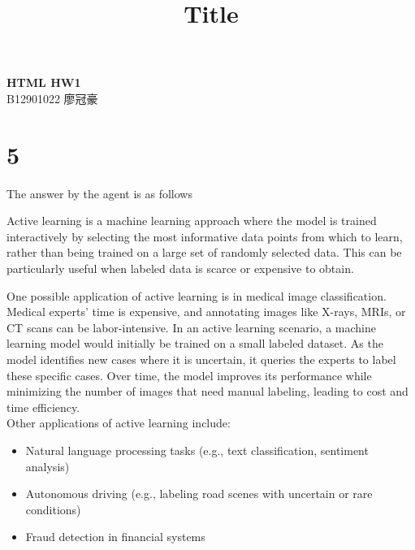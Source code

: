 \documentclass[11pt]{article}
\theoremstyle{definition}
\begin{document}
\setcounter{section}{0}
\title{Title}

\thispagestyle{empty}
\begin{center}
  {\large \bf HTML HW1} \\ 
  B12901022 廖冠豪
\end{center}
\section*{5}
The answer by the agent is as follows
\begin{displayquote}
  Active learning is a machine learning approach where the model is trained interactively by selecting the most informative data points from which to learn, rather than being trained on a large set of randomly selected data. This can be particularly useful when labeled data is scarce or expensive to obtain.

One possible application of active learning is in medical image classification. Medical experts' time is expensive, and annotating images like X-rays, MRIs, or CT scans can be labor-intensive. In an active learning scenario, a machine learning model would initially be trained on a small labeled dataset. As the model identifies new cases where it is uncertain, it queries the experts to label these specific cases. Over time, the model improves its performance while minimizing the number of images that need manual labeling, leading to cost and time efficiency. \\ 
Other applications of active learning include:
  \begin{itemize}
    \item Natural language processing tasks (e.g., text classification, sentiment analysis)
    \item Autonomous driving (e.g., labeling road scenes with uncertain or rare conditions)
    \item Fraud detection in financial systems
  \end{itemize}
\end{displayquote}
\end{document}
